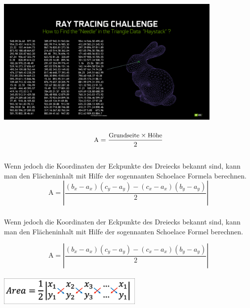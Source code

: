 \documentclass{beamer}
\begin{document}
\begin{frame}
	\frametitle{\phantom{}}
	\centering
	\includegraphics[width=11cm]{bilder/ray.png}
\end{frame}

\begin{frame}
	\frametitle{\phantom{}}
		\vspace{-1cm}
		\[
		\small
	\text{A} = \frac{\text{Grundseite} \times \text{Höhe}}{2}
		\] \\
		\vspace{4mm}
		\textmd{\small Wenn jedoch die Koordinaten der Eckpunkte des Dreiecks bekannt sind, kann man den Flächeninhalt mit Hilfe der sogennanten Schoelace Formela berechnen.}
		\[
		\text{A} = |\frac{(b_{x} - a_{x})(c_{y} - a_{y}) - (c_{x} - a_{x})(b_{y} - a_{y})}{2}|
		\]	
\end{frame}

\begin{frame}
	\frametitle{\phantom{}}
	\textmd{\small Wenn jedoch die Koordinaten der Eckpunkte des Dreiecks bekannt sind, kann man den Flächeninhalt mit Hilfe der sogennanten Schoelace Formel berechnen.}
	
	\[
	\text{A} = |\frac{(b_{x} - a_{x})(c_{y} - a_{y}) - (c_{x} - a_{x})(b_{y} - a_{y})}{2}|
	\]	\\
	\centering
	\includegraphics[width=7cm]{bilder/shoe.png}
\end{frame}
\end{document}
